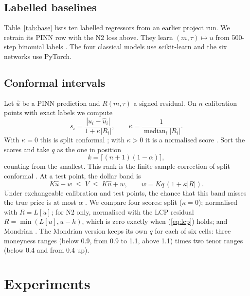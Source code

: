 \documentclass[conference]{IEEEtran}
\DeclareMathOperator*{\median}{median}
\begin{document}
\subsection{Labelled baselines}
Table~\ref{tab:base} lists ten labelled regressors from an earlier project run. We retrain its PINN row with the N2 loss above. They learn $(m,\tau)\mapsto u$ from 500-step binomial labels \cite{cox1979option}. The four classical models use scikit-learn \cite{pedregosa2011scikit} and the six networks use PyTorch.

\subsection{Conformal intervals}
Let $\hat u$ be a PINN prediction and $R(m,\tau)$ a signed residual. On $n$ calibration points with exact labels we compute
\begin{equation}
s_i=\frac{|u_i-\hat u_i|}{1+\kappa|R_i|},\qquad \kappa=\frac{1}{\median_i|R_i|}. \label{eq:score}
\end{equation}
With $\kappa=0$ this is split conformal \cite{papadopoulos2002inductive}; with $\kappa>0$ it is a normalised score \cite{papadopoulos2011regression}. Sort the scores and take $q$ as the one in position
\begin{equation}
k=\lceil (n+1)(1-\alpha)\rceil , \label{eq:k}
\end{equation}
counting from the smallest. This rank is the finite-sample correction of split conformal \cite{lei2018distribution}. At a test point, the dollar band is
\begin{equation}
K\hat u-w\;\le\;V\;\le\;K\hat u+w,\qquad w=Kq\,(1+\kappa|R|). \label{eq:band}
\end{equation}
Under exchangeable calibration and test points, the chance that this band misses the true price is at most $\alpha$ \cite{lei2018distribution}. We compare four scores: split ($\kappa=0$); normalised with $R=L[u]$; for N2 only, normalised with the LCP residual $R=\min(L[u],u-h)$, which is zero exactly when (\ref{eq:lcp}) holds; and Mondrian \cite{bostrom2020mondrian}. The Mondrian version keeps its own $q$ for each of six cells: three moneyness ranges (below 0.9, from 0.9 to 1.1, above 1.1) times two tenor ranges (below 0.4 and from 0.4 up).

\section{Experiments}
\end{document}
